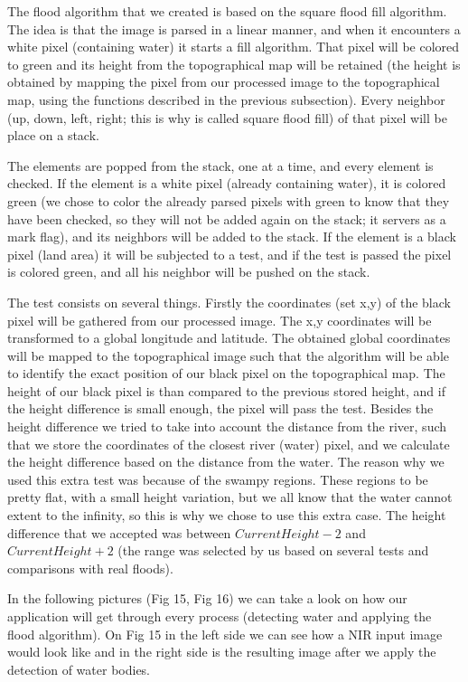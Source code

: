\documentclass[12pt, a4paper]{report}
\begin{document}
The flood algorithm that we created is based on the square flood fill algorithm. The idea is that the image is parsed in a linear manner, and when it encounters a white pixel (containing water) it starts a fill algorithm. That pixel will be colored to green and its height from the topographical map will be retained (the height is obtained by mapping the pixel from our processed image to the topographical map, using the functions described in the previous subsection). Every neighbor (up, down, left, right; this is why is called square flood fill) of that pixel will be place on a stack. \par 
The elements are popped from the stack, one at a time, and every element is checked. If the element is a white pixel (already containing water), it is colored green (we chose to color the already parsed pixels with green to know that they have been checked, so they will not be added again on the stack; it servers as a mark flag), and its neighbors will be added to the stack. If the element is a black pixel (land area) it will be subjected to a test, and if the test is passed the pixel is colored green, and all his neighbor will be pushed on the stack. 
\par 
The test consists on several things. Firstly the coordinates (set x,y) of the black pixel will be gathered from our processed image. The x,y coordinates will be transformed to a global longitude and latitude. The obtained global coordinates will be mapped to the topographical image such that the algorithm will be able to identify the exact position of our black pixel on the topographical map. The height of our black pixel is than compared to the previous stored height, and if the height difference is small enough, the pixel will pass the test. Besides the height difference we tried to take into account the distance from the river, such that we store the coordinates of the closest river (water) pixel, and we calculate the height difference based on the distance from the water. The reason why we used this extra test was because of the swampy regions. These regions to be pretty flat, with a small height variation, but we all know that the water cannot extent to the infinity, so this is why we chose to use this extra case. The height difference that we accepted was between \textbf{$CurrentHeight - 2$} and \textbf{$CurrentHeight + 2$} (the range was selected by us based on several tests and comparisons with real floods).
\par 
In the following pictures (Fig 15, Fig 16) we can take a look on how our application will get through every process (detecting water and applying the flood algorithm). On Fig 15 in the left side we can see how a NIR input image would look like and in the right side is the resulting image after we apply the detection of water bodies.
\end{document}
